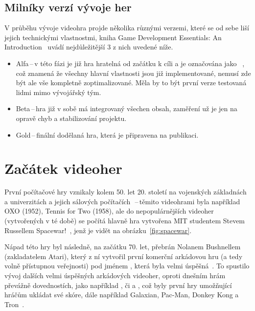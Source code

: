 \subsection*{Milníky verzí vývoje her}
V průběhu vývoje videohra projde několika různými verzemi, které se od sebe liší jejich technickými vlastnostmi, kniha Game Development Essentials: An Introduction~\cite{novak2011game} uvádí nejdůležitější 3 z nich uvedené níže.
\begin{itemize}
    \item Alfa\,--\,v této fázi je již hra hratelná od začátku k cíli a je označována jako \textit{}~\cite{CG_Spectrum_GAMEDEVELOPMENT}, což znamená že všechny hlavní vlastnosti jsou již implementované, nemusí zde být ale vše kompletně zoptimalizované. Měla by to být první verze testovaná lidmi mimo vývojářský tým.
    \item Beta\,--\,hra již v sobě má integrovaný všechen obsah, zaměření už je jen na opravě chyb a stabilizování projektu.
    \item Gold\,--\,finální dodělaná hra, která je připravena na publikaci.
\end{itemize}

\section{Začátek videoher}
První počítačové hry vznikaly kolem 50. let 20. století na vojenských základnách a univerzitách a jejich sálových počítačích~\cite{novak2011game}\,--\,těmito videohrami byla například OXO (1952), Tennis for Two (1958), ale do nepopulárnějších videoher (vytvořených v té době) se počítá hlavně hra vytvořena MIT studentem Stevem Russellem Spacewar!~\cite{bellis2019spacewar}, jenž je vidět na obrázku~\ref{fig:spacewar}. 


Nápad této hry byl následně, na začátku 70. let, přebrán Nolanem Bushnellem (zakladatelem Atari), který z ní vytvořil první komerční arkádovou hru (a tedy volně přístupnou veřejnosti) pod jménem , která byla velmi úspěšná~\cite{video_games_history}. To spustilo vývoj dalších velmi úspěšných arkádových videoher, oproti dnešním hrám převážně dovednostích, jako například , či  a , což byly první hry umožňující hráčům ukládat své skóre, dále například Galaxian, Pac-Man, Donkey Kong a Tron~\cite{novak2011game}.


